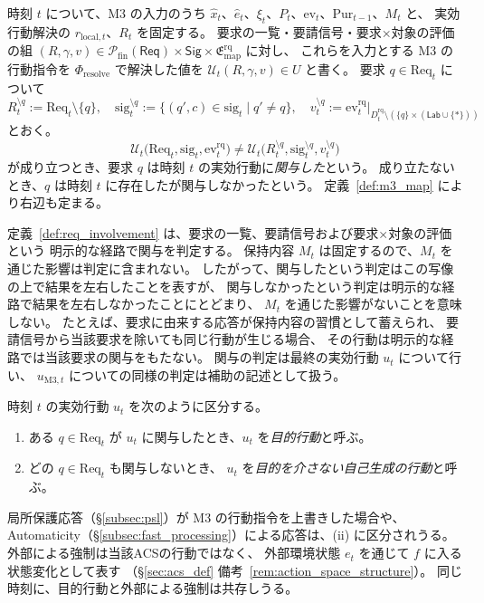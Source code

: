 \begin{definition}
\label{def:req_involvement}
時刻 $t$ について、M3 の入力のうち
$\hat x_t$、$\hat e_t$、$\xi_t$、$P_t$、$\mathrm{ev}_t$、$\mathrm{Pur}_{t-1}$、$M_t$ と、
実効行動解決の $r_{\mathrm{local},t}$、$R_t$ を固定する。
要求の一覧・要請信号・要求×対象の評価の組
$(R,\gamma,v)\in\mathcal P_{\mathrm{fin}}(\mathsf{Req})\times\mathsf{Sig}\times\mathfrak E^{\mathrm{rq}}_{\mathrm{map}}$ に対し、
これらを入力とする M3 の行動指令を $\Phi_{\mathrm{resolve}}$ で解決した値を
$\mathcal U_t(R,\gamma,v)\in U$ と書く。
要求 $q\in\mathrm{Req}_t$ について
\[
  R^{\setminus q}_t:=\mathrm{Req}_t\setminus\{q\},\quad
  \mathrm{sig}^{\setminus q}_t:=\{(q',c)\in \mathrm{sig}_t\mid q'\neq q\},\quad
  v^{\setminus q}_t:=\mathrm{ev}^{\mathrm{rq}}_t\big|_{D^{\mathrm{rq}}_t\setminus(\{q\}\times(\mathsf{Lab}\cup\{\ast\}))}
\]
とおく。
\[
  \mathcal U_t\bigl(\mathrm{Req}_t,\mathrm{sig}_t,\mathrm{ev}^{\mathrm{rq}}_t\bigr)
  \neq
  \mathcal U_t\bigl(R^{\setminus q}_t,\mathrm{sig}^{\setminus q}_t,v^{\setminus q}_t\bigr)
\]
が成り立つとき、要求 $q$ は時刻 $t$ の実効行動に\emph{関与した}という。
成り立たないとき、$q$ は時刻 $t$ に存在したが関与しなかったという。
定義~\ref{def:m3_map} により右辺も定まる。
\end{definition}

\begin{remark}[関与の判定の射程]
\label{rem:involvement_scope}
定義~\ref{def:req_involvement} は、要求の一覧、要請信号および要求×対象の評価という
明示的な経路で関与を判定する。
保持内容 $M_t$ は固定するので、$M_t$ を通じた影響は判定に含まれない。
したがって、関与したという判定はこの写像の上で結果を左右したことを表すが、
関与しなかったという判定は明示的な経路で結果を左右しなかったことにとどまり、
$M_t$ を通じた影響がないことを意味しない。
たとえば、要求に由来する応答が保持内容の習慣として蓄えられ、
要請信号から当該要求を除いても同じ行動が生じる場合、
その行動は明示的な経路では当該要求の関与をもたない。
関与の判定は最終の実効行動 $u_t$ について行い、
$u_{\mathrm{M3},t}$ についての同様の判定は補助の記述として扱う。
\end{remark}

\begin{definition}
\label{def:action_classes}
時刻 $t$ の実効行動 $u_t$ を次のように区分する。
\begin{enumerate}[label=(\roman*)]
  \item ある $q\in\mathrm{Req}_t$ が $u_t$ に関与したとき、$u_t$ を\emph{目的行動}と呼ぶ。
  \item どの $q\in\mathrm{Req}_t$ も関与しないとき、
  $u_t$ を\emph{目的を介さない自己生成の行動}と呼ぶ。
\end{enumerate}
局所保護応答（\S\ref{subsec:psl}）が M3 の行動指令を上書きした場合や、
Automaticity（\S\ref{subsec:fast_processing}）による応答は、(ii) に区分されうる。
外部による強制は当該ACSの行動ではなく、
外部環境状態 $e_t$ を通じて $f$ に入る状態変化として表す
（\S\ref{sec:acs_def} 備考~\ref{rem:action_space_structure}）。
同じ時刻に、目的行動と外部による強制は共存しうる。
\end{definition}

